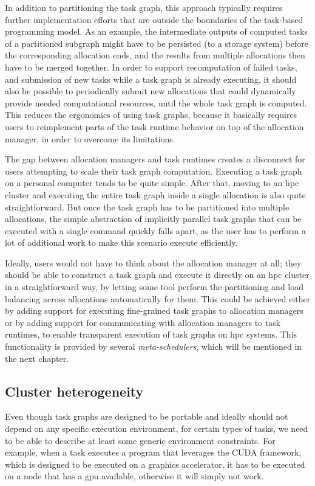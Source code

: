 In addition to partitioning the task graph, this approach typically requires further implementation
efforts that are outside the boundaries of the task-based programming model. As an example, the
intermediate outputs of computed tasks of a partitioned subgraph might have to be persisted (to a
storage system) before the corresponding allocation ends, and the results from multiple allocations
then have to be merged together. In order to support recomputation of failed tasks, and submission
of new tasks while a task graph is already executing, it should also be possible to periodically
submit new allocations that could dynamically provide needed computational resources, until the
whole task graph is computed. This reduces the ergonomics of using task graphs, because it
basically requires users to reimplement parts of the task runtime behavior on top of the allocation
manager, in order to overcome its limitations.

\vspace{5mm}
The gap between allocation managers and task runtimes creates a disconnect for users attempting to
scale their task graph computation. Executing a task graph on a personal computer tends to be quite
simple. After that, moving to an \gls{hpc} cluster and executing the entire task
graph inside a single allocation is also quite straightforward. But once the task graph has to be
partitioned into multiple allocations, the simple abstraction of implicitly parallel task graphs
that can be executed with a single command quickly falls apart, as the user has to perform a lot of
additional work to make this scenario execute efficiently.

Ideally, users would not have to think about the allocation manager at all; they should be able to
construct a task graph and execute it directly on an \gls{hpc} cluster in a
straightforward way, by letting some tool perform the partitioning and load balancing across
allocations automatically for them. This could be achieved either by adding support for executing
fine-grained task graphs to allocation managers or by adding support for communicating with
allocation managers to task runtimes, to enable transparent execution of task graphs on
\gls{hpc} systems. This functionality is provided by several
\emph{meta-schedulers}, which will be mentioned in the next chapter.

\subsection{Cluster heterogeneity}
Even though task graphs are designed to be portable and ideally should not depend on any specific
execution environment, for certain types of tasks, we need to be able to describe at least some
generic environment constraints. For example, when a task executes a program that leverages the
CUDA framework, which is designed to be executed on a graphics
accelerator, it has to be executed on a node that has a \gls{gpu} available,
otherwise it will simply not work.

